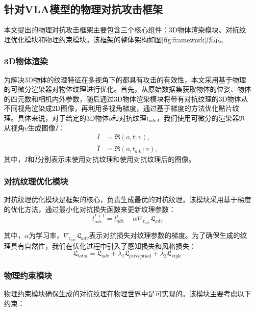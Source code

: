 
\subsection{针对VLA模型的物理对抗攻击框架}

本文提出的物理对抗攻击框架主要包含三个核心组件：3D物体渲染模块、对抗纹理优化模块和物理约束模块。该框架的整体架构如图\ref{fig:framework}所示。

\subsubsection{3D物体渲染}

为解决3D物体的纹理特征在多视角下的都具有攻击的有效性，本文采用基于物理的可微分渲染器对物体纹理进行优化。首先，从原始数据集获取物体的位姿、物体的四元数和相机内外参数，随后通过3D物体渲染模块将带有对抗纹理的3D物体从不同视角渲染成2D图像，再利用多视角梯度，通过基于梯度的方法优化贴片纹理。具体来说，对于给定的3D物体$o$和对抗纹理$t_{adv}$，我们使用可微分的渲染器$\mathfrak{R}$从视角$v$生成图像$\hat{I}$： 
\begin{align}
    I &= \mathfrak{R}(o, t; v),\\
    \hat{I} &= \mathfrak{R}(o, t_{adv}; v),
\end{align}
其中，$I$和$\hat{I}$分别表示未使用对抗纹理和使用对抗纹理后的图像。

\subsubsection{对抗纹理优化模块}
对抗纹理优化模块是框架的核心，负责生成最优的对抗纹理。该模块采用基于梯度的优化方法，通过最小化对抗损失函数来更新纹理参数：
\begin{equation}
    t_{adv}^{t+1} = t_{adv}^t - \alpha \nabla_{t_{adv}} \mathfrak{L}_{adv}
\end{equation}

其中，$\alpha$为学习率，$\nabla_{t_{adv}} \mathfrak{L}_{adv}$表示对抗损失对纹理参数的梯度。为了确保生成的纹理具有自然性，我们在优化过程中引入了感知损失和风格损失：
\begin{equation}
    \mathfrak{L}_{total} = \mathfrak{L}_{adv} + \lambda_1\mathfrak{L}_{perceptual} + \lambda_2\mathfrak{L}_{style}
\end{equation}

\subsubsection{物理约束模块}
物理约束模块确保生成的对抗纹理在物理世界中是可实现的。该模块主要考虑以下约束：

